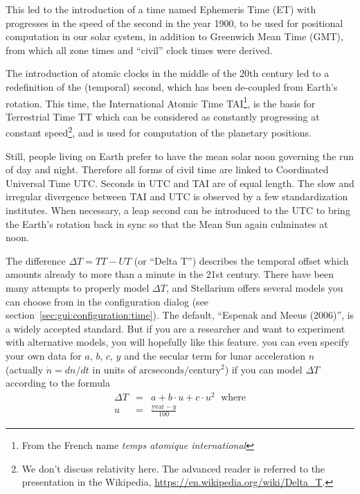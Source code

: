 This led to the introduction of a time named Ephemeris Time (ET) with
progresses in the speed of the second in the year 1900, to be used for
positional computation in our solar system, in addition to Greenwich
Mean Time (GMT), from which all zone times and ``civil'' clock times were
derived.

The introduction of atomic clocks in the middle of the 20th century
led to a redefinition of the (temporal) second, which has been
de-coupled from Earth's rotation. This time, the International Atomic
Time TAI\footnote{From the French name \textit{temps atomique international}}, is the basis for Terrestrial Time TT which can be
considered as constantly progressing at constant speed\footnote{We
  don't discuss relativity here. The advanced reader is referred to
  the presentation in the Wikipedia,
  \url{https://en.wikipedia.org/wiki/Delta_T}.}, and is used for
computation of the planetary positions.

Still, people living on Earth prefer to have the mean solar noon
governing the run of day and night. Therefore all forms of civil time
are linked to Coordinated Universal Time UTC. Seconds in UTC and TAI
are of equal length. The slow and irregular divergence between TAI and
UTC is observed by a few standardization institutes.  When necessary,
a leap second can be introduced to the UTC to bring the Earth's
rotation back in sync so that the Mean Sun again culminates at noon.

The difference $\Delta T=TT-UT$ (or ``Delta T'') describes the
temporal offset which amounts already to more than a minute in the 21st
century. There have been many attempts to properly model $\Delta T$,
and Stellarium offers several models you can choose from in the
configuration dialog (see
section~\ref{sec:gui:configuration:time}). The default, ``Espenak and
Meeus (2006)'', is a widely accepted standard. But if you are a
researcher and want to experiment with alternative models, you will
hopefully like this feature. you can even specify your own data for
$a$, $b$, $c$, $y$ and the secular term for lunar acceleration $n$
(actually $\dot{n}=dn/dt$ in units of
$\mathrm{arcseconds}/\mathrm{century}^2$) if you can model $\Delta T$
according to the formula
\begin{eqnarray}
  \label{eq:DeltaT:custom}
  \Delta T &=& a+ b\cdot u + c \cdot u^2 \, \ \ \text{where}\\
         u &=& \frac{\mathrm{year}-y}{100}
\end{eqnarray}

